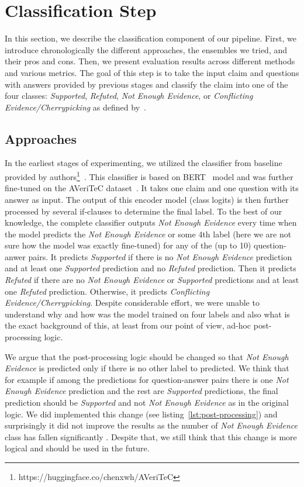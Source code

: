 
\section{Classification Step}
In this section, we describe the classification component of our pipeline. First, we introduce chronologically the different approaches, the ensembles we tried, and their pros and cons. Then, we present evaluation results across different methods and various metrics. The goal of this step is to take the input claim and questions with answers provided by previous stages  and classify the claim into one of the four classes: \textit{Supported}, \textit{Refuted}, \textit{Not Enough Evidence}, or \textit{Conflicting Evidence/Cherrypicking} as defined by~\citealp{averitec2024}.

\subsection{Approaches}

In the earliest stages of experimenting, we utilized the classifier from baseline provided by authors\footnote{https://huggingface.co/chenxwh/AVeriTeC}~\cite{averitec2024}. This classifier is based on BERT~\cite{devlin-etal-2019-bert} model and was further fine-tuned on the AVeriTeC dataset~\cite{averitec2024}. It takes one claim and one question with its answer as input. The output of this encoder model (class logits) is then further processed by several if-clauses to determine the final label. To the best of our knowledge, the complete classifier outputs \textit{Not Enough Evidence} every time when the model predicts the \textit{Not Enough Evidence} or some 4th label (here we are not sure how the model was exactly fine-tuned) for any of the (up to 10) question-anwer pairs. It predicts \textit{Supported} if there is no \textit{Not Enough Evidence} prediction and at least one \textit{Supported} prediction and no \textit{Refuted} prediction. Then it predicts \textit{Refuted} if there are no \textit{Not Enough Evidence} or \textit{Supported} predictions and at least one \textit{Refuted} prediction. Otherwise, it predicts \textit{Conflicting Evidence/Cherrypicking}. Despite considerable effort, we were unable to understand why and how was the model trained on four labels and also what is the exact background of this, at least from our point of view, ad-hoc post-processing logic.

We argue that the post-processing logic should be changed so that \textit{Not Enough Evidence} is predicted only if there is no other label to predicted. We think that for example if among the predictions for question-answer pairs there is one \textit{Not Enough Evidence} prediction and the rest are \textit{Supported} predictions, the final prediction should be \textit{Supported} and not \textit{Not Enough Evidence} as in the original logic. We did implemented this change (see listing~\ref{lst:post-processing}) and surprisingly it did not improve the results as the number of \textit{Not Enough Evidence} class has fallen significantly . Despite that, we still think that this change is more logical and should be used in the future.

